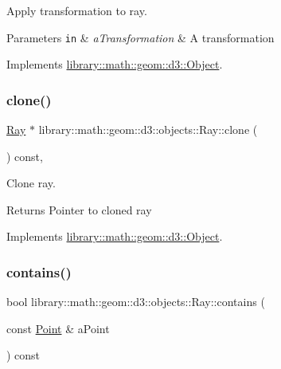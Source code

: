 Apply transformation to ray. 


\begin{DoxyParams}[1]{Parameters}
\mbox{\tt in}  & {\em a\+Transformation} & A transformation \\
\hline
\end{DoxyParams}


Implements \hyperlink{classlibrary_1_1math_1_1geom_1_1d3_1_1_object_a5fc47b1ee5d9a28efc6010d3d1512470}{library\+::math\+::geom\+::d3\+::\+Object}.

\mbox{\label{classlibrary_1_1math_1_1geom_1_1d3_1_1objects_1_1_ray_a247ea36c39c3b44d003b157689850ae4}} 
\subsubsection{\texorpdfstring{clone()}{clone()}}
{\footnotesize\ttfamily \hyperlink{classlibrary_1_1math_1_1geom_1_1d3_1_1objects_1_1_ray}{Ray} $\ast$ library\+::math\+::geom\+::d3\+::objects\+::\+Ray\+::clone (\begin{DoxyParamCaption}{ }\end{DoxyParamCaption}) const\hspace{0.3cm}{\ttfamily [override]}, {\ttfamily [virtual]}}



Clone ray. 

\begin{DoxyReturn}{Returns}
Pointer to cloned ray 
\end{DoxyReturn}


Implements \hyperlink{classlibrary_1_1math_1_1geom_1_1d3_1_1_object_a1a784c6b359e0eb97cd34fabc42f2f3f}{library\+::math\+::geom\+::d3\+::\+Object}.

\mbox{\label{classlibrary_1_1math_1_1geom_1_1d3_1_1objects_1_1_ray_a6179dc1453ac7a54b13fe6bf46c0a66b}} 
\subsubsection{\texorpdfstring{contains()}{contains()}}
{\footnotesize\ttfamily bool library\+::math\+::geom\+::d3\+::objects\+::\+Ray\+::contains (\begin{DoxyParamCaption}\item[{const \hyperlink{classlibrary_1_1math_1_1geom_1_1d3_1_1objects_1_1_point}{Point} \&}]{a\+Point }\end{DoxyParamCaption}) const}



